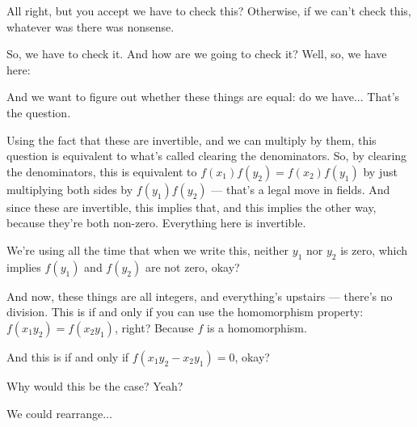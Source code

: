 \begin{speech}[00:25:18 - 00:27:08]
All right, but you accept we have to check this? Otherwise, if we can't check this, whatever was there was nonsense.

So, we have to check it. And how are we going to check it? Well, so, we have here: 

And we want to figure out whether these things are equal: do we have...  That's the question.

Using the fact that these are invertible, and we can multiply by them, this question is equivalent to what's called clearing the denominators. So, by clearing the denominators, this is equivalent  to $f(x_1) f(y_2) = f(x_2) f(y_1)$ by just multiplying both sides by $f(y_1) f(y_2)$  --- that's a legal move in fields. And since these are invertible, this implies that, and this implies the other way, because they're both non-zero. Everything here is invertible.

We're using all the time that when we write this,  neither $y_1$ nor $y_2$ is zero, which implies $f(y_1)$ and $f(y_2)$ are not zero, okay?
\end{speech}

\begin{speech}[00:27:08 - 00:27:50]
And now, these things are all integers, and everything's upstairs --- there's no division. This is if and only if  you can use the homomorphism property:  $f(x_1 y_2) = f(x_2 y_1)$, right? Because $f$ is a homomorphism.

And this is if and only if  $f(x_1 y_2 - x_2 y_1) = 0$, okay?

Why would this be the case? Yeah?
\end{speech}

\begin{student}
We could rearrange...
\end{student}

